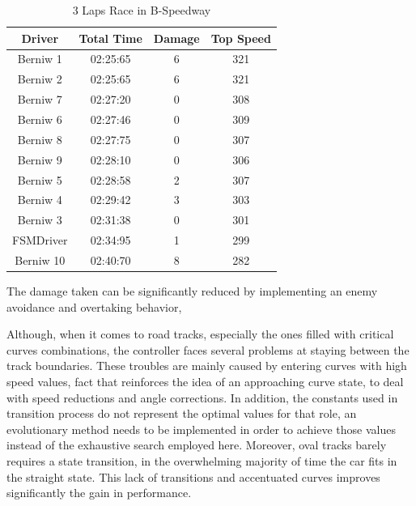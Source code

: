 \begin{table}[h]
\renewcommand{\arraystretch}{1.3}
\caption{3 Laps Race in B-Speedway}
\label{table_results_B}
\centering
\begin{tabular}{c||c||c||c}
\hline
\bfseries Driver & \bfseries Total Time & \bfseries Damage & \bfseries Top Speed \\ 
\hline
\hline Berniw 1 & 02:25:65 & 6 & 321 \\
\hline Berniw 2 & 02:25:65 & 6 & 321 \\
\hline Berniw 7 & 02:27:20 & 0 & 308 \\
\hline Berniw 6 & 02:27:46 & 0 & 309 \\
\hline Berniw 8 & 02:27:75 & 0 & 307 \\
\hline Berniw 9 & 02:28:10 & 0 & 306 \\
\hline Berniw 5 & 02:28:58 & 2 & 307 \\
\hline Berniw 4 & 02:29:42 & 3 & 303 \\
\hline Berniw 3 & 02:31:38 & 0 & 301 \\
\hline FSMDriver & 02:34:95 & 1 & 299 \\ 
\hline Berniw 10 & 02:40:70 & 8 & 282 \\ 
\hline 
\end{tabular}
\end{table}



The damage taken can be significantly reduced by implementing an enemy avoidance and overtaking behavior,

Although, when it comes to road tracks, especially the ones filled with critical curves combinations, the controller faces several problems at staying between the track boundaries. These troubles are mainly caused by entering curves with high speed values, fact that reinforces the idea of an approaching curve state, to deal with speed reductions and angle corrections. In addition, the constants used in transition process do not represent the optimal values for that role, an evolutionary method needs to be implemented in order to achieve those values instead of the exhaustive search employed here. Moreover, oval tracks barely requires a state transition, in the overwhelming majority of time the car fits in the straight state. This lack of transitions and accentuated curves improves significantly the gain in performance.

